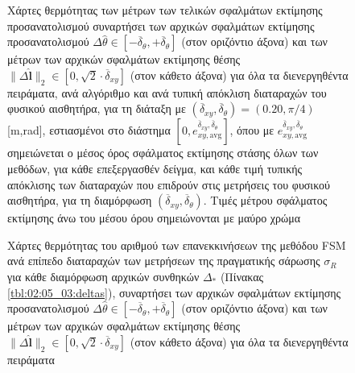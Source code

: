 \begin{figure}\vspace{1cm}\hspace{0.5cm}
  
  \vspace{1cm}
  \caption{\small Χάρτες θερμότητας των μέτρων των τελικών σφαλμάτων εκτίμησης
           προσανατολισμού συναρτήσει των αρχικών σφαλμάτων εκτίμησης
           προσανατολισμού $\Delta\hat{\theta} \in
           [-\overline{\delta}_{\theta},+\overline{\delta}_{\theta}]$ (στον
           οριζόντιο άξονα) και των μέτρων των αρχικών σφαλμάτων εκτίμησης
           θέσης $\|\Delta \hat{\bm{l}}\|_2 \in [0, \sqrt{2}\cdot
           \overline{\delta}_{xy}]$ (στον κάθετο άξονα) για όλα τα
           διενεργηθέντα πειράματα, ανά αλγόριθμο και ανά τυπική απόκλιση
           διαταραχών του φυσικού αισθητήρα, για τη διάταξη με
           $(\overline{\delta}_{xy}, \overline{\delta}_{\theta}) = (0.20,
           \pi/4)$ [m,rad], εστιασμένοι στο διάστημα $[0,
           e_{xy,\text{avg}}^{\overline{\delta}_{xy},
           \overline{\delta}_{\theta}}]$, όπου με
           $e_{xy,\text{avg}}^{\overline{\delta}_{xy},
           \overline{\delta}_{\theta}}$ σημειώνεται ο μέσος όρος σφάλματος
           εκτίμησης στάσης όλων των μεθόδων, για κάθε επεξεργασθέν δείγμα, και
           κάθε τιμή τυπικής απόκλισης των διαταραχών που επιδρούν στις
           μετρήσεις του φυσικού αισθητήρα, για τη διαμόρφωση
           $(\overline{\delta}_{xy}, \overline{\delta}_{\theta})$.  Τιμές
           μέτρου σφάλματος εκτίμησης άνω του μέσου όρου σημειώνονται με μαύρο
           χρώμα}
  \label{fig:02_05_03:02:07}
\end{figure}

\begin{figure}\vspace{1cm}\hspace{0.5cm}
  
  \vspace{1cm}
  \caption{\small Χάρτες θερμότητας του αριθμού των επανεκκινήσεων της μεθόδου
           FSM ανά επίπεδο διαταραχών των μετρήσεων της πραγματικής
           σάρωσης $\sigma_R$ για κάθε διαμόρφωση αρχικών συνθηκών
           $\Delta_\ast$ (Πίνακας \ref{tbl:02:05_03:deltas}), συναρτήσει των
           αρχικών σφαλμάτων εκτίμησης προσανατολισμού $\Delta\hat{\theta} \in
           [-\overline{\delta}_{\theta},+\overline{\delta}_{\theta}]$ (στον
           οριζόντιο άξονα) και των μέτρων των αρχικών σφαλμάτων εκτίμησης
           θέσης $\|\Delta \hat{\bm{l}}\|_2 \in [0, \sqrt{2}\cdot
           \overline{\delta}_{xy}]$ (στον κάθετο άξονα) για όλα τα
           διενεργηθέντα πειράματα}
  \label{fig:02_05_03:02:08}
\end{figure}

